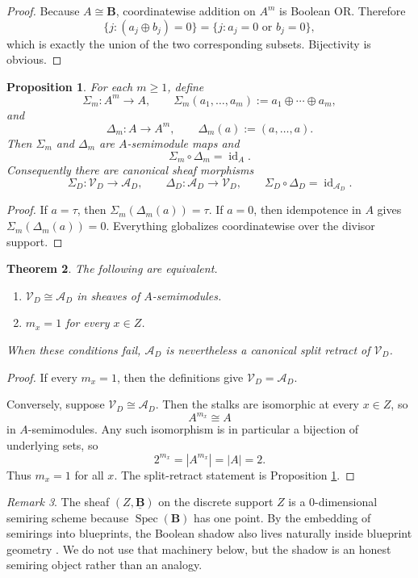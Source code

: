 \documentclass[11pt,a4paper]{article}
\newtheorem{theorem}{Theorem}[section]
\newtheorem{proposition}[theorem]{Proposition}
\theoremstyle{definition}
\theoremstyle{remark}
\newtheorem{remark}[theorem]{Remark}
\DeclareMathOperator{\Spec}{Spec}
\newcommand{\BB}{\mathbf B}
\newcommand{\cV}{\mathcal V}
\newcommand{\cA}{\mathcal A}
\newcommand{\taup}{\tau}
\begin{document}
\begin{proof}
Because $A\cong\BB$, coordinatewise addition on $A^m$ is Boolean OR.  Therefore
\[
\{j:(a_j\oplus b_j)=0\}=\{j:a_j=0\text{ or }b_j=0\},
\]
which is exactly the union of the two corresponding subsets.  Bijectivity is obvious.
\end{proof}

\begin{proposition}\label{prop:retract-shadow}
For each $m\ge1$, define
\[
\Sigma_m:A^m\to A,
\qquad
\Sigma_m(a_1,\dots,a_m):=a_1\oplus\cdots\oplus a_m,
\]
and
\[
\Delta_m:A\to A^m,
\qquad
\Delta_m(a):=(a,\dots,a).
\]
Then $\Sigma_m$ and $\Delta_m$ are $A$-semimodule maps and
\[
\Sigma_m\circ\Delta_m=\operatorname{id}_A.
\]
Consequently there are canonical sheaf morphisms
\[
\Sigma_D:\cV_D\to\cA_D,
\qquad
\Delta_D:\cA_D\to\cV_D,
\qquad
\Sigma_D\circ\Delta_D=\operatorname{id}_{\cA_D}.
\]
\end{proposition}

\begin{proof}
If $a=\taup$, then $\Sigma_m(\Delta_m(a))=\taup$.  If $a=0$, then idempotence in $A$ gives $\Sigma_m(\Delta_m(a))=0$.  Everything globalizes coordinatewise over the divisor support.
\end{proof}

\begin{theorem}\label{thm:reduced-vs-multiplicity}
The following are equivalent.
\begin{enumerate}[label=(\roman*)]
\item $\cV_D\cong\cA_D$ in sheaves of $A$-semimodules.
\item $m_x=1$ for every $x\in Z$.
\end{enumerate}
When these conditions fail, $\cA_D$ is nevertheless a canonical split retract of $\cV_D$.
\end{theorem}

\begin{proof}
If every $m_x=1$, then the definitions give $\cV_D=\cA_D$.

Conversely, suppose $\cV_D\cong\cA_D$.  Then the stalks are isomorphic at every $x\in Z$, so
\[
A^{m_x}\cong A
\]
in $A$-semimodules.  Any such isomorphism is in particular a bijection of underlying sets, so
\[
2^{m_x}=|A^{m_x}|=|A|=2.
\]
Thus $m_x=1$ for all $x$.  The split-retract statement is Proposition \ref{prop:retract-shadow}.
\end{proof}

\begin{remark}
The sheaf $(Z,\underline{\BB})$ on the discrete support $Z$ is a $0$-dimensional semiring scheme because $\Spec(\BB)$ has one point.  By the embedding of semirings into blueprints, the Boolean shadow also lives naturally inside blueprint geometry \cite{Lorscheid}.  We do not use that machinery below, but the shadow is an honest semiring object rather than an analogy.
\end{remark}
\end{document}
